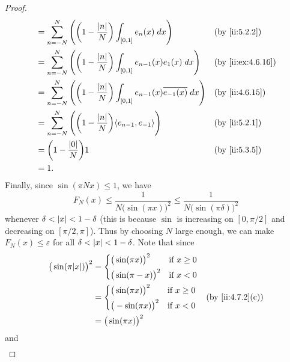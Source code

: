 \begin{proof}
\begin{align*}
     & = \sum_{n = -N}^N \Bigg(\bigg(1 - \dfrac{\abs{n}}{N}\bigg) \int_{[0, 1]} e_n(x) \; dx\Bigg)                            &  & \by{ii:5.2.2}     \\
     & = \sum_{n = -N}^N \Bigg(\bigg(1 - \dfrac{\abs{n}}{N}\bigg) \int_{[0, 1]} e_{n - 1}(x) e_1(x) \; dx\Bigg)               &  & \by{ii:ex:4.6.16} \\
     & = \sum_{n = -N}^N \Bigg(\bigg(1 - \dfrac{\abs{n}}{N}\bigg) \int_{[0, 1]} e_{n - 1}(x) \overline{e_{-1}(x)} \; dx\Bigg) &  & \by{ii:4.6.15}    \\
     & = \sum_{n = -N}^N \Bigg(\bigg(1 - \dfrac{\abs{n}}{N}\bigg) \inner*{e_{n - 1}, e_{-1}}\Bigg)                            &  & \by{ii:5.2.1}     \\
     & = \bigg(1 - \dfrac{\abs{0}}{N}\bigg) 1                                                                                 &  & \by{ii:5.3.5}     \\
     & = 1.
  \end{align*}
  Finally, since \(\sin(\pi N x) \leq 1\), we have
  \[
    F_N(x) \leq \dfrac{1}{N \big(\sin(\pi x)\big)^2} \leq \dfrac{1}{N \big(\sin(\pi \delta)\big)^2}
  \]
  whenever \(\delta < \left\lvert x\right\rvert < 1 - \delta\)
  (this is because \(\sin\) is increasing on \([0, \pi / 2]\) and decreasing on \([\pi / 2, \pi]\)).
  Thus by choosing \(N\) large enough, we can make \(F_N (x) \leq \varepsilon\) for all \(\delta < \left\lvert x\right\rvert < 1 - \delta\).
  Note that since
  \begin{align*}
    \big(\sin(\pi \abs{x})\big)^2 & = \begin{dcases}
                                        \big(\sin(\pi x)\big)^2  & \text{if } x \geq 0 \\
                                        \big(\sin(\pi -x)\big)^2 & \text{if } x < 0
                                      \end{dcases} \\
                                  & = \begin{dcases}
                                        \big(\sin(\pi x)\big)^2  & \text{if } x \geq 0 \\
                                        \big(-\sin(\pi x)\big)^2 & \text{if } x < 0
                                      \end{dcases} &  & \by{ii:4.7.2}[c] \\
                                  & = \big(\sin(\pi x)\big)^2
  \end{align*}
  and
  \begin{align*}

\end{align*}
\end{proof}

